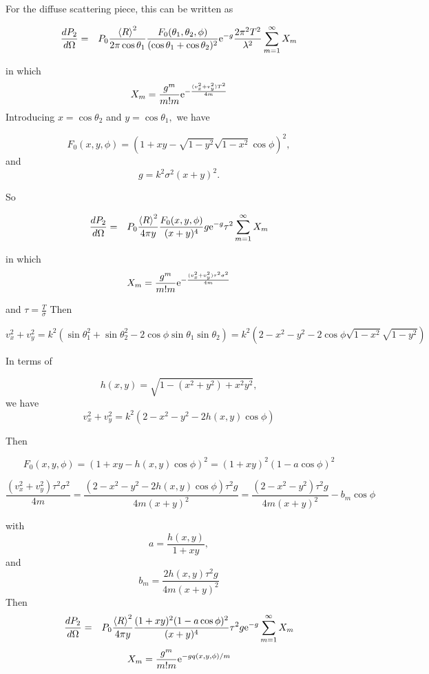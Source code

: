 \documentclass[11pt,openany]{report}
\newcommand{\der}[2]{\frac{d {#1}}{d {#2}}}
\newcommand{\e}{{\rm e}}
\begin{document}
{{For the diffuse scattering piece, this can be written as

\begin{eqnarray}
\der{P_{2}}{\Omega}&=&P_{0}\frac{\left<R\right>^{2}}{2\pi\cos\theta_{1}}\frac{F_{0}(\theta_{1},\theta_{2},\phi)}{(\cos{\theta_{1}}+\cos{\theta_{2}})^{2}}\e^{-g}\frac{2\pi^{2}T^{2}}{\lambda^{2}}\sum_{m=1}^{\infty}X_{m}\end{eqnarray}

in which
$$X_{m}=\frac{g^{m}}{m!m}\e^{-\frac{(v_{x}^{2}+v_{y}^{2})T^{2}}{4m}}$$
Introducing $x=\cos\theta_{2}$ and $y=\cos\theta_{1},$ we have

$$F_{0}(x,y,\phi)=\left(1+xy-\sqrt{1-y^{2}}\sqrt{1-x^{2}}\cos\phi\right)^{2},$$
and
$$g=k^{2}\sigma^{2}(x+y)^{2}.$$

So

\begin{eqnarray}
\der{P_{2}}{\Omega}&=&P_{0}\frac{\left<R\right>^{2}}{4\pi y}\frac{F_{0}(x,y,\phi)}{(x+y)^{4}}g\e^{-g}\tau^{2}\sum_{m=1}^{\infty}X_{m}\end{eqnarray}

in which
$$X_{m}=\frac{g^{m}}{m!m}\e^{-\frac{(v_{x}^{2}+v_{y}^{2})\tau^{2}\sigma^{2}}{4m}}$$

and $\tau=\frac{T}{\sigma}$
Then

$$v_{x}^{2}+v_{y}^{2}=k^{2}\left(\sin\theta_{1}^{2}+\sin\theta_{2}^{2}-2\cos\phi\sin\theta_{1}\sin\theta_{2}\right)=k^{2}\left(2-x^{2}-y^{2}-2\cos\phi\sqrt{1-x^{2}}\sqrt{1-y^{2}}\right)$$

In terms of 

$$h(x,y)=\sqrt{1-(x^{2}+y^{2})+x^{2}y^{2}},$$
we have
$$v_{x}^{2}+v_{y}^{2}=k^{2}\left(2-x^{2}-y^{2}-2h(x,y)\cos\phi\right)$$

Then

$$F_{0}(x,y,\phi)=\left(1+xy-h(x,y)\cos\phi\right)^{2}=(1+xy)^{2}(1-a\cos\phi)^{2}$$

$$\frac{(v_{x}^{2}+v_{y}^{2})\tau^{2}\sigma^{2}}{4m}=\frac{\left(2-x^{2}-y^{2}-2h(x,y)\cos\phi\right)\tau^{2}g}{4m(x+y)^{2}}=\frac{\left(2-x^{2}-y^{2}\right)\tau^{2}g}{4m(x+y)^{2}}-b_{m}\cos\phi$$

with
$$a=\frac{h(x,y)}{1+xy},$$
and
$$b_{m}=\frac{2h(x,y)\tau^{2}g}{4m(x+y)^{2}}$$
Then
\begin{eqnarray}\der{P_{2}}{\Omega}&=&P_{0}\frac{\left<R\right>^{2}}{4\pi y}\frac{(1+xy)^{2}(1-a\cos\phi)^{2}}{(x+y)^{4}}\tau^{2}g\e^{-g}\sum_{m=1}^{\infty}X_{m}\end{eqnarray}
$$X_{m}=\frac{g^{m}}{m!m}\e^{-gq(x,y,\phi)/m}$$

}}
\end{document}
